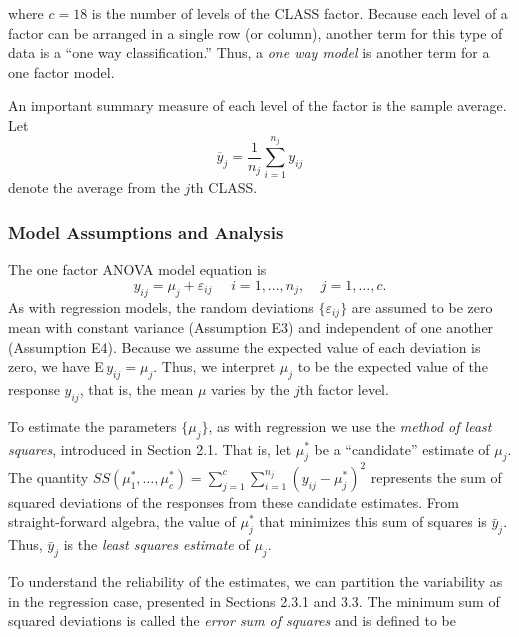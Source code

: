 \noindent where $c=18$ is the number of levels of the CLASS factor.
Because each level of a factor can be arranged in a single row (or
column), another term for this type of data is a ``one way
classification.'' Thus, a \textit{one way model} is another term for
a one factor model.

An important summary measure of each level of the factor is the sample
average. Let
\begin{equation*}
\overline{y}_j=\frac{1}{n_j}\sum_{i=1}^{n_j}y_{ij}
\end{equation*}
denote the average from the $j$th CLASS.

\subsubsection*{Model Assumptions and Analysis}

The one factor ANOVA model equation is
\begin{equation}\label{E4:OneFactorEquation}
y_{ij}=\mu_j+ \varepsilon_{ij}\ \ \ \ \ \ i=1,\ldots ,n_j,\ \ \ \ \
j=1,\ldots ,c.
\end{equation}
As with regression models, the random deviations $\{
\varepsilon_{ij} \}$ are assumed to be zero mean with constant
variance (Assumption E3) and independent of one another (Assumption
E4). Because we assume the expected value of each deviation is zero,
we have E$\,y_{ij}=\mu_j$. Thus, we interpret $\mu_j$ to be the
expected value of the response $y_{ij}$, that is, the mean $\mu$
varies by the $j$th factor level.

To estimate the parameters $\{\mu_j\}$, as with regression we use
the \textit{method of least squares}, introduced in Section 2.1.
That is, let $\mu^{\ast}_j$ be a ``candidate'' estimate of $\mu_j$.
The quantity $ SS(\mu^{\ast}_1, \ldots , \mu^{\ast}_{c}) =
\sum_{j=1}^{c} \sum_{i=1}^{n_j} (y_{ij}-\mu^{\ast}_j)^2 $ represents
the sum of squared deviations of the responses from these candidate
estimates. From straight-forward algebra, the value of
$\mu^{\ast}_j$ that minimizes this sum of squares is $\bar{y}_j$.
Thus, $\bar{y}_j$ is the \textit{least squares estimate }of $\mu
_j$.


To understand the reliability of the estimates, we can partition the
variability as in the regression case, presented in Sections 2.3.1
and 3.3. The minimum sum of squared deviations is called the
\textit{error sum of squares} and is defined to be

